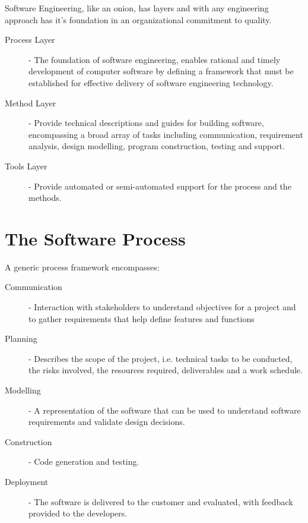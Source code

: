 \documentclass[12pt letter]{report}
\begin{document}
Software Engineering, like an onion, has layers and with any engineering approach has it's foundation in an
organizational commitment to quality.
\begin{description}
  \item[Process Layer]  - The foundation of software engineering, enables rational and timely development of computer
        software by defining a framework that must be established for effective delivery of software engineering
        technology.
  \item[Method Layer] - Provide technical descriptions and guides for building software, encompassing a broad array of
        tasks including communication, requirement analysis, design modelling, program construction, testing and support.
  \item[Tools Layer] - Provide automated or semi-automated support for the process and the methods.
\end{description}

\section{The Software Process}


A generic process framework encompasses:
\begin{description}
  \item[Communication] - Interaction with stakeholders to understand objectives for a project and to gather requirements that help define features and functions
  \item[Planning] - Describes the scope of the project, i.e. technical tasks to be conducted, the risks involved, the resources required, deliverables and a work schedule.
  \item[Modelling] - A representation of the software that can be used to understand software requirements and validate design decisions.
  \item[Construction] - Code generation and testing.
  \item[Deployment] - The software is delivered to the customer and evaluated, with feedback provided to the developers.
\end{description}
\end{document}
